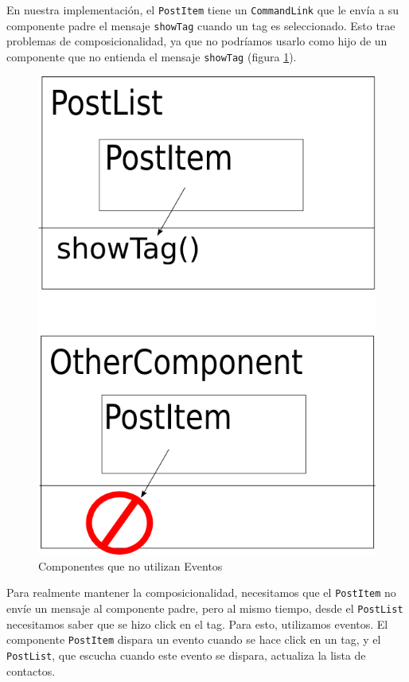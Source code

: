 En nuestra implementación, el \verb"PostItem" tiene un \verb"CommandLink" que le envía a su componente padre el mensaje \verb"showTag" cuando un tag es seleccionado. Esto trae problemas de composicionalidad, ya que no podríamos usarlo como hijo de un componente que no entienda el mensaje \verb"showTag"  (figura \ref{fig-comp1}).

\begin{figure}
	\centering
	\includegraphics*[scale=0.20]{images/componentes.png}
 	\caption{Componentes que no utilizan Eventos}
 	\label{fig-comp1}
\end{figure}

Para realmente mantener la composicionalidad, necesitamos que el \verb"PostItem" no envíe un mensaje al componente padre, pero al mismo tiempo, desde el \verb'PostList' necesitamos saber que se hizo click en el tag. Para esto, utilizamos eventos. El componente \verb'PostItem' dispara un evento cuando se hace click en un tag, y el \verb'PostList', que escucha cuando este evento se dispara, actualiza la lista de contactos.

